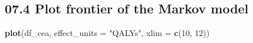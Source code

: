 \documentclass[
]{article}
\newenvironment{Shaded}{\begin{snugshade}}{\end{snugshade}}
\newcommand{\DataTypeTok}[1]{\textcolor[rgb]{0.13,0.29,0.53}{#1}}
\newcommand{\DecValTok}[1]{\textcolor[rgb]{0.00,0.00,0.81}{#1}}
\newcommand{\KeywordTok}[1]{\textcolor[rgb]{0.13,0.29,0.53}{\textbf{#1}}}
\newcommand{\NormalTok}[1]{#1}
\newcommand{\StringTok}[1]{\textcolor[rgb]{0.31,0.60,0.02}{#1}}
\begin{document}
\hypertarget{plot-frontier-of-the-markov-model}{%
\subsection{07.4 Plot frontier of the Markov
model}\label{plot-frontier-of-the-markov-model}}

\begin{Shaded}
\begin{Highlighting}[]
\KeywordTok{plot}\NormalTok{(df_cea, }\DataTypeTok{effect_units =} \StringTok{"QALYs"}\NormalTok{, }\DataTypeTok{xlim =} \KeywordTok{c}\NormalTok{(}\DecValTok{10}\NormalTok{, }\DecValTok{12}\NormalTok{))}
\end{Highlighting}
\end{Shaded}
\end{document}
